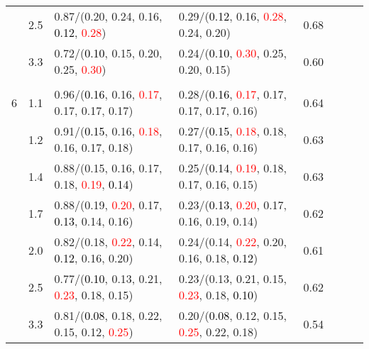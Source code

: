 \documentclass[10pt,a4paper]{report}
\begin{document}
\begin{table}[!htbp]
\begin{center}
{\begin{tabular}{ccllcccc}
			&2.5&0.87/(0.20, 0.24, 0.16, \textcolor{black}{0.12}, \textcolor{red}{0.28})&0.29/(\textcolor{black}{0.12}, 0.16, \textcolor{red}{0.28}, 0.24, 0.20)&0.68\\
			&3.3&0.72/(\textcolor{black}{0.10}, 0.15, 0.20, 0.25, \textcolor{red}{0.30})&0.24/(\textcolor{black}{0.10}, \textcolor{red}{0.30}, 0.25, 0.20, 0.15)&0.60\\
			&&&&\\
			6			&1.1&0.96/(\textcolor{black}{0.16}, 0.16, \textcolor{red}{0.17}, 0.17, 0.17, 0.17)&0.28/(\textcolor{black}{0.16}, \textcolor{red}{0.17}, 0.17, 0.17, 0.17, 0.16)&0.64\\
			&1.2&0.91/(\textcolor{black}{0.15}, 0.16, \textcolor{red}{0.18}, 0.16, 0.17, 0.18)&0.27/(\textcolor{black}{0.15}, \textcolor{red}{0.18}, 0.18, 0.17, 0.16, 0.16)&0.63\\
			&1.4&0.88/(0.15, 0.16, 0.17, 0.18, \textcolor{red}{0.19}, \textcolor{black}{0.14})&0.25/(\textcolor{black}{0.14}, \textcolor{red}{0.19}, 0.18, 0.17, 0.16, 0.15)&0.63\\
			&1.7&0.88/(0.19, \textcolor{red}{0.20}, 0.17, \textcolor{black}{0.13}, 0.14, 0.16)&0.23/(\textcolor{black}{0.13}, \textcolor{red}{0.20}, 0.17, 0.16, 0.19, 0.14)&0.62\\
			&2.0&0.82/(0.18, \textcolor{red}{0.22}, 0.14, \textcolor{black}{0.12}, 0.16, 0.20)&0.24/(0.14, \textcolor{red}{0.22}, 0.20, 0.16, 0.18, \textcolor{black}{0.12})&0.61\\
			&2.5&0.77/(\textcolor{black}{0.10}, 0.13, 0.21, \textcolor{red}{0.23}, 0.18, 0.15)&0.23/(0.13, 0.21, 0.15, \textcolor{red}{0.23}, 0.18, \textcolor{black}{0.10})&0.62\\
			&3.3&0.81/(\textcolor{black}{0.08}, 0.18, 0.22, 0.15, 0.12, \textcolor{red}{0.25})&0.20/(\textcolor{black}{0.08}, 0.12, 0.15, \textcolor{red}{0.25}, 0.22, 0.18)&0.54\\
			\bottomrule
		\end{tabular}}
	\end{center}
\end{table}
\end{document}
